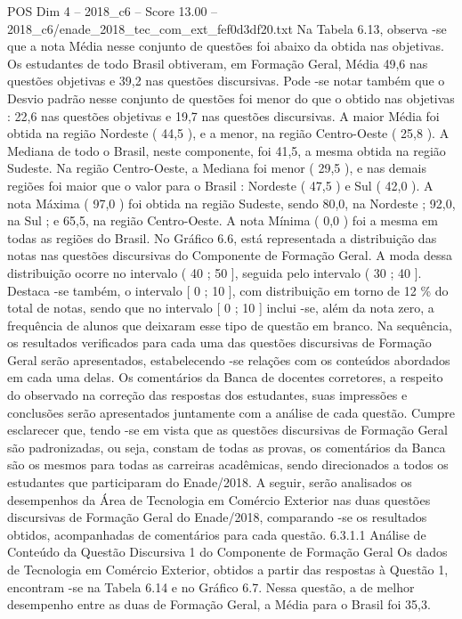\begin{textsample}{POS Dim 4 – 2018\_c6 – Score 13.00 – 2018\_c6/enade\_2018\_tec\_com\_ext\_fef0d3df20.txt}
Na Tabela 6.13, observa -se que a nota Média nesse conjunto de questões foi abaixo da obtida nas objetivas.
Os estudantes de todo Brasil obtiveram, em Formação Geral, Média 49,6 nas questões objetivas e 39,2 nas questões discursivas.
Pode -se notar também que o Desvio padrão nesse conjunto de questões foi menor do que o obtido nas objetivas : 22,6 nas questões objetivas e 19,7 nas questões discursivas.
A maior Média foi obtida na região Nordeste ( 44,5 ), e a menor, na região Centro-Oeste ( 25,8 ).
A Mediana de todo o Brasil, neste componente, foi 41,5, a mesma obtida na região Sudeste.
Na região Centro-Oeste, a Mediana foi menor ( 29,5 ), e nas demais regiões foi maior que o valor para o Brasil : Nordeste ( 47,5 ) e Sul ( 42,0 ).
A nota Máxima ( 97,0 ) foi obtida na região Sudeste, sendo 80,0, na Nordeste ; 92,0, na Sul ; e 65,5, na região Centro-Oeste.
A nota Mínima ( 0,0 ) foi a mesma em todas as regiões do Brasil.
No Gráfico 6.6, está representada a distribuição das notas nas questões discursivas do Componente de Formação Geral.
A moda dessa distribuição ocorre no intervalo ( 40 ; 50 ], seguida pelo intervalo ( 30 ; 40 ].
Destaca -se também, o intervalo [ 0 ; 10 ], com distribuição em torno de 12 \% do total de notas, sendo que no intervalo [ 0 ; 10 ] inclui -se, além da nota zero, a frequência de alunos que deixaram esse tipo de questão em branco.
Na sequência, os resultados verificados para cada uma das questões discursivas de Formação Geral serão apresentados, estabelecendo -se relações com os conteúdos abordados em cada uma delas.
Os comentários da Banca de docentes corretores, a respeito do observado na correção das respostas dos estudantes, suas impressões e conclusões serão apresentados juntamente com a análise de cada questão.
Cumpre esclarecer que, tendo -se em vista que as questões discursivas de Formação Geral são padronizadas, ou seja, constam de todas as provas, os comentários da Banca são os mesmos para todas as carreiras acadêmicas, sendo direcionados a todos os estudantes que participaram do Enade/2018.
A seguir, serão analisados os desempenhos da Área de Tecnologia em Comércio Exterior nas duas questões discursivas de Formação Geral do Enade/2018, comparando -se os resultados obtidos, acompanhadas de comentários para cada questão. 6.3.1.1 Análise de Conteúdo da Questão Discursiva 1 do Componente de Formação Geral Os dados de Tecnologia em Comércio Exterior, obtidos a partir das respostas à Questão 1, encontram -se na Tabela 6.14 e no Gráfico 6.7.
Nessa questão, a de melhor desempenho entre as duas de Formação Geral, a Média para o Brasil foi 35,3.

\end{textsample}
